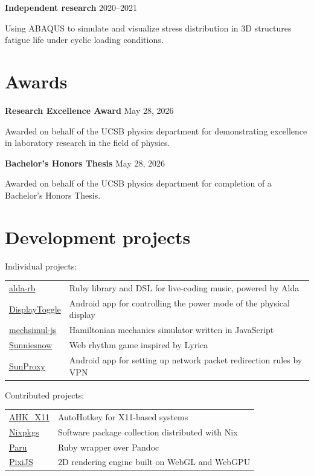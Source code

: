 \documentclass[letterpaper,12pt]{article}
\newenvironment{job}[2]{
	\textbf{#1} \hfill #2\par\vspace{-0.5\baselineskip}
}{}
\begin{document}
\begin{job}{Independent research}{2020--2021}
	Using ABAQUS to simulate and visualize stress distribution in 3D structures
	fatigue life under cyclic loading conditions.
\end{job}

\section{Awards}

\begin{job}{Research Excellence Award}{May 28, 2026}
	Awarded on behalf of the UCSB physics department
	for demonstrating excellence in laboratory research in the field of physics.
\end{job}

\begin{job}{Bachelor's Honors Thesis}{May 28, 2026}
	Awarded on behalf of the UCSB physics department
	for completion of a Bachelor's Honors Thesis.
\end{job}

\section{Development projects}

Individual projects:\par\vspace{-0.5\baselineskip}
\begin{tabularx}{\linewidth}{lX}
\href{https://ulysseszh.github.io/doc/alda-rb/}{alda-rb} &
Ruby library and DSL for live-coding music, powered by Alda \\
\href{https://github.com/UlyssesZh/DisplayToggle}{DisplayToggle} &
Android app for controlling the power mode of the physical display \\
\href{https://github.com/UlyssesZh/mechsimul-js}{mechsimul-js} &
Hamiltonian mechanics simulator written in JavaScript \\
\href{https://sunniesnow.github.io/game/}{Sunniesnow} &
Web rhythm game inspired by Lyrica \\
\href{https://github.com/UlyssesZh/SunProxy}{SunProxy} &
Android app for setting up network packet redirection rules by VPN \\
\end{tabularx}

Contributed projects:\par\vspace{-0.5\baselineskip}
\begin{tabularx}{\linewidth}{lX}
\href{https://phil294.github.io/AHK_X11}{AHK\_X11} &
AutoHotkey for X11-based systems \\
\href{https://github.com/nixos/nixpkgs}{Nixpkgs} &
Software package collection distributed with Nix \\
\href{https://heerdebeer.org/Software/markdown/paru/}{Paru} &
Ruby wrapper over Pandoc \\
\href{https://pixijs.com}{PixiJS} &
2D rendering engine built on WebGL and WebGPU \\
\end{tabularx}
\end{document}
